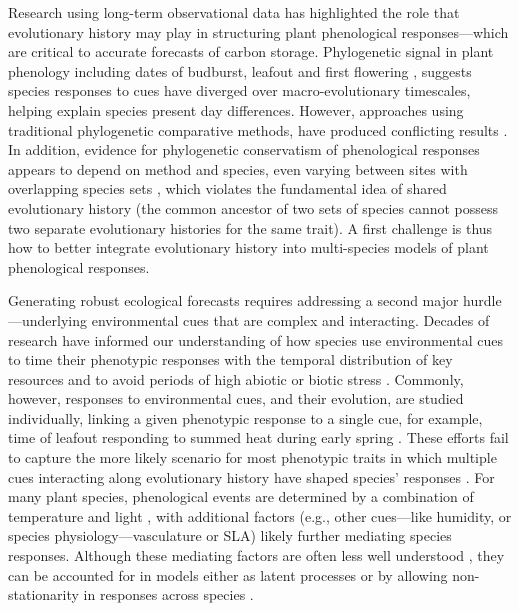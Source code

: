 \documentclass[11pt]{article}
\begin{document}
Research using long-term observational data has highlighted the role that evolutionary history may play in structuring plant phenological responses---which are critical to accurate forecasts of carbon storage. Phylogenetic signal in plant phenology including dates of budburst, leafout and first flowering \citep{kochmer1986constraints,willis2008phylogenetic,davies2013phylogenetic}, suggests species responses to cues have diverged over macro-evolutionary timescales, helping explain species present day differences. 
However, approaches using traditional phylogenetic comparative methods, have produced conflicting results \citep[e.g.,][]{willis2008phylogenetic,CaraDonna2015,yang2021afm}. In addition, evidence for phylogenetic conservatism of phenological responses appears to depend on method and species, even varying between sites with overlapping species sets \citep[e.g.,][]{rafferty2017global}, which violates the fundamental idea of shared evolutionary history (the common ancestor of two sets of species cannot possess two separate evolutionary histories for the same trait). A first challenge is thus how to better integrate evolutionary history into multi-species models of plant phenological responses.

Generating robust ecological forecasts requires addressing a second major hurdle---underlying environmental cues that are complex and interacting. Decades of research have informed our understanding of how species use environmental cues to time their phenotypic responses with the temporal distribution of key resources and to avoid periods of high abiotic or biotic stress \citep{larcher1980,bonamour2019}. Commonly, however, responses to environmental cues, and their evolution, are studied individually, linking a given phenotypic response to a single cue, for example, time of leafout responding to summed heat during early spring \citep{davies2013phylogenetic}. These efforts fail to capture the more likely scenario for most phenotypic traits in which multiple cues interacting along evolutionary history have shaped species' responses \citep{Ackerly:2009ly}. For many plant species, phenological events are determined by a combination of temperature and light \citep{chuinearees}, with additional factors (e.g., other cues---like humidity, or species physiology---vasculature or SLA) likely further mediating species responses. Although these mediating factors are often less well understood \citep{chuinearees}, they can be accounted for in models either as latent processes or by allowing non-stationarity in responses across species \citep{davies2019phylogenetically}.  
\end{document}
